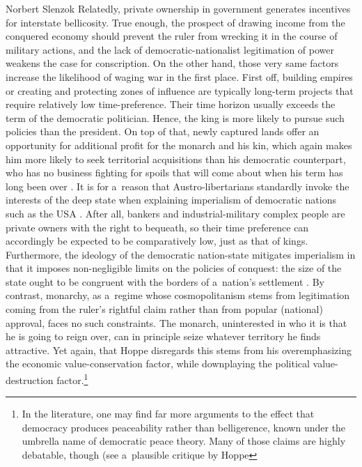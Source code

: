 \begin{artengenv}{Norbert Slenzok}
Relatedly, private ownership in government generates incentives for interstate bellicosity. True enough, the prospect of drawing income from the conquered economy should prevent the ruler from wrecking it in the course of military actions, and the lack of democratic-nationalist legitimation of power weakens the case for conscription. On the other hand, those very same factors increase the likelihood of waging war in the first place. First off, building empires or creating and protecting zones of influence are typically long-term projects that require relatively low time-preference. Their time horizon usually exceeds the term of the democratic politician. Hence, the king is more likely to pursue such policies than the president. On top of that, newly captured lands offer an opportunity for additional profit for the monarch and his kin, which again makes him more likely to seek territorial acquisitions than his democratic counterpart, who has no business fighting for spoils that will come about when his term has long been over 
\parencite[][p.121]{mises_liberalism_1985}. %
 It is for a~reason that Austro-libertarians standardly invoke the interests of the deep state when explaining imperialism of democratic nations such as the USA 
\parencites[][]{rothbard_wall_2011}[][pp.77–116]{hoppe_economics_2006}. %
 After all, bankers and industrial-military complex people are private owners with the right to bequeath, so their time preference can accordingly be expected to be comparatively low, just as that of kings. Furthermore, the ideology of the democratic nation-state mitigates imperialism in that it imposes non-negligible limits on the policies of conquest: the size of the state ought to be congruent with the borders of a~nation's settlement 
\parencites[][p.1]{gellner_nations_1993}[][p.118]{mises_liberalism_1985}. %
 By contrast, monarchy, as a~regime whose cosmopolitanism stems from legitimation coming from the ruler's rightful claim rather than from popular (national) approval, faces no such constraints. The monarch, uninterested in who it is that he is going to reign over, can in principle seize whatever territory he finds attractive. Yet again, that Hoppe disregards this stems from his overemphasizing the economic value-conservation factor, while downplaying the political value-destruction factor.\footnote{In the literature, one may find far more arguments to the effect that democracy produces peaceability rather than belligerence, known under the umbrella name of democratic peace theory. Many of those claims are highly debatable, though (see a~plausible critique by Hoppe
}
\end{artengenv}
